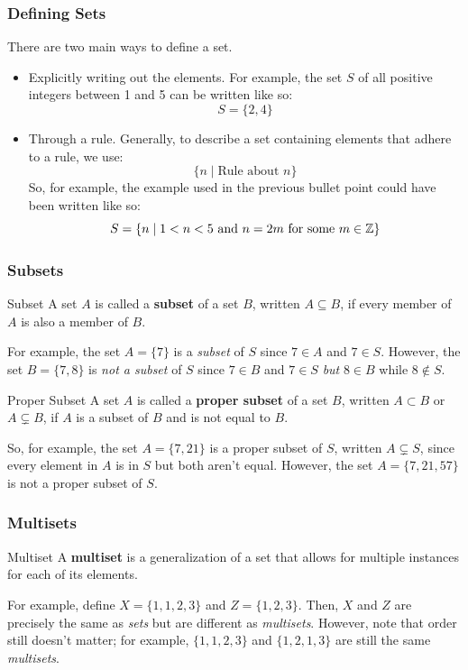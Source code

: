 \documentclass[letterpaper]{article}
\begin{document}
\subsubsection{Defining Sets}

There are two main ways to define a set. 
\begin{itemize}
    \item Explicitly writing out the elements. For example, the set $S$ of all positive integers between 1 and 5 can be written like so: 
    \[S = \{2, 4\}\]

    \item Through a rule. Generally, to describe a set containing elements that adhere to a rule, we use:
    \[\{n \mid \text{Rule about } n\}\]
    So, for example, the example used in the previous bullet point could have been written like so: 
    \[S = \{n \mid 1 < n < 5 \text{ and } n = 2m \text{ for some } m \in \mathbb{Z}\}\]
\end{itemize}

\subsubsection{Subsets}

\begin{definition}{Subset}{}
    A set $A$ is called a \textbf{subset} of a set $B$, written $A \subseteq B$, if every member of $A$ is also a member of $B$. 
\end{definition}
For example, the set $A = \{7\}$ is a \emph{subset} of $S$ since $7 \in A$ and $7 \in S$. However, the set $B = \{7, 8\}$ is \emph{not a subset} of $S$ since $7 \in B$ and $7 \in S$ \emph{but} $8 \in B$ while $8 \notin S$. 

\begin{definition}{Proper Subset}{}
    A set $A$ is called a \textbf{proper subset} of a set $B$, written $A \subset B$ or $A \subsetneq B$, if $A$ is a subset of $B$ and is not equal to $B$. 
\end{definition}
So, for example, the set $A = \{7, 21\}$ is a proper subset of $S$, written $A \subsetneq S$, since every element in $A$ is in $S$ but both aren't equal. However, the set $A = \{7, 21, 57\}$ is not a proper subset of $S$. 

\subsubsection{Multisets}

\begin{definition}{Multiset}{}
    A \textbf{multiset} is a generalization of a set that allows for multiple instances for each of its elements. 
\end{definition}
For example, define $X = \{1, 1, 2, 3\}$ and $Z = \{1, 2, 3\}$. Then, $X$ and $Z$ are precisely the same as \emph{sets} but are different as \emph{multisets}. However, note that order still doesn't matter; for example, $\{1, 1, 2, 3\}$ and $\{1, 2, 1, 3\}$ are still the same \emph{multisets}. 
\end{document}
